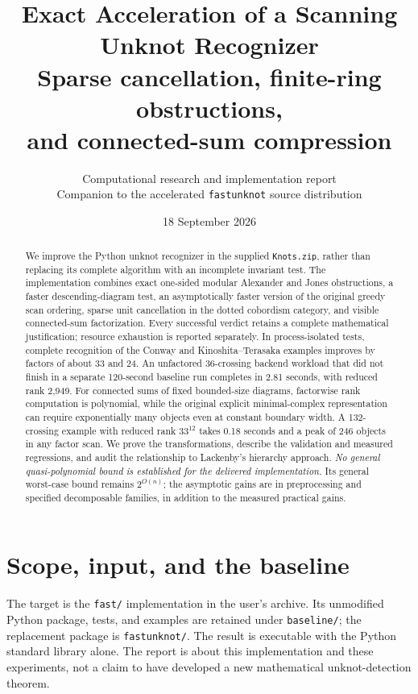 \documentclass[11pt]{article}
\title{Exact Acceleration of a Scanning Unknot Recognizer\\[4pt]
\large Sparse cancellation, finite-ring obstructions,\\and connected-sum compression}
\author{Computational research and implementation report\\
\small Companion to the accelerated \texttt{fastunknot} source distribution}
\date{18 September 2026}
\theoremstyle{definition}\newtheorem{definition}[theorem]{Definition}
\theoremstyle{remark}\newtheorem{remark}[theorem]{Remark}
\begin{document}
\maketitle
\begin{abstract}
We improve the Python unknot recognizer in the supplied \texttt{Knots.zip},
rather than replacing its complete algorithm with an incomplete invariant test.
The implementation combines exact one-sided modular Alexander and Jones
obstructions, a faster descending-diagram test, an asymptotically faster version
of the original greedy scan ordering, sparse unit cancellation in the dotted
cobordism category, and visible connected-sum factorization. Every successful
verdict retains a complete mathematical justification; resource exhaustion is
reported separately. In process-isolated tests, complete recognition of the
Conway and Kinoshita--Terasaka examples improves by factors of about 33 and 24.
An unfactored 36-crossing backend workload that did not finish in a separate
120-second baseline run completes in 2.81 seconds, with reduced rank 2,949.
For connected sums of fixed bounded-size diagrams, factorwise rank computation
is polynomial, while the original explicit minimal-complex representation can
require exponentially many objects even at constant boundary width. A
132-crossing example with reduced rank $33^{12}$ takes 0.18 seconds and a peak of
246 objects in any factor scan. We prove the transformations, describe the
validation and measured regressions, and audit the relationship to Lackenby's
hierarchy approach. \emph{No general quasi-polynomial bound is established for
the delivered implementation.} Its general worst-case bound remains
$2^{O(n)}$; the asymptotic gains are in preprocessing and specified decomposable
families, in addition to the measured practical gains.
\end{abstract}
\tableofcontents

\section{Scope, input, and the baseline}
The target is the \texttt{fast/} implementation in the user's archive. Its
unmodified Python package, tests, and examples are retained under
\texttt{baseline/}; the replacement package is \texttt{fastunknot/}. The
result is executable with the Python standard library alone. The report is
about this implementation and these experiments, not a claim to have developed
a new mathematical unknot-detection theorem.
\end{document}
